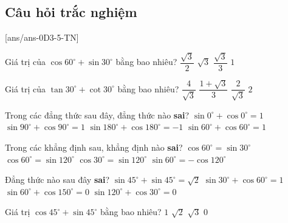\subsection{Câu hỏi trắc nghiệm}
[ans/ans-0D3-5-TN]
\begin{ex}%
	Giá trị của $\cos 60^\circ+\sin 30^\circ$ bằng bao nhiêu?
	\choice
	{$\dfrac{\sqrt{3}}{2}$}
	{$\sqrt{3}$}
	{$\dfrac{\sqrt{3}}{3}$}
	{\True $1$}
\end{ex}
\begin{ex}%
	Giá trị của $\tan 30^\circ+\cot 30^\circ$ bằng bao nhiêu?
	\choice
	{\True $\dfrac{4}{\sqrt{3}}$}
	{$\dfrac{1+\sqrt{3}}{3}$}
	{$\dfrac{2}{\sqrt{3}}$}
	{$2$}
\end{ex}
\begin{ex}%
	Trong các đẳng thức sau đây, đẳng thức nào \textbf{sai}?
	\choice
	{$\sin 0^\circ+\cos 0^\circ=1$}
	{$\sin 90^\circ+\cos 90^\circ=1$}
	{$\sin 180^\circ+\cos 180^\circ=-1$}
	{\True $\sin 60^\circ+\cos 60^\circ=1$}
\end{ex}
\begin{ex}%
	Trong các khẳng định sau, khẳng định nào \textbf{sai}?
	\choice
	{$\cos 60^\circ=\sin 30^\circ$}
	{\True $\cos 60^\circ=\sin 120^\circ$}
	{$\cos 30^\circ=\sin 120^\circ$}
	{$\sin 60^\circ=-\cos 120^\circ$}
\end{ex}
\begin{ex}%
	Đẳng thức nào sau đây \textbf{sai}?
	\choice
	{$\sin 45^\circ+\sin 45^\circ=\sqrt{2}$}
	{$\sin 30^\circ+\cos 60^\circ=1$}
	{$\sin 60^\circ+\cos 150^\circ=0$}
	{\True $\sin 120^\circ+\cos 30^\circ=0$}
\end{ex}
\begin{ex}%
	Giá trị $\cos 45^\circ+\sin 45^\circ$ bằng bao nhiêu?
	\choice
	{$1$}
	{\True $\sqrt{2}$}
	{$\sqrt{3}$}
	{$0$}
\end{ex}

